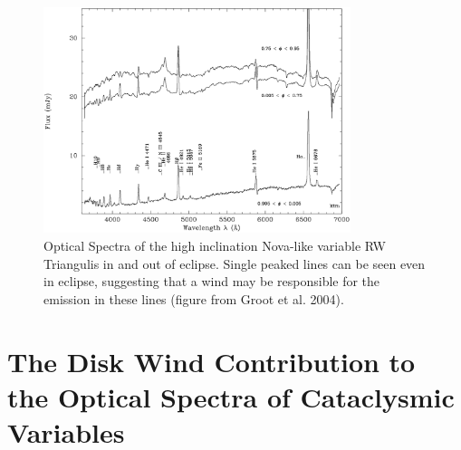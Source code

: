 \documentclass[useAMS,usenatbib,onecolumn]{mn2e2}
\begin{document}





%
%


\begin{figure}
\centering
\includegraphics[width=0.8\textwidth]{figures/groot11.eps}
\caption{Optical Spectra of the high inclination Nova-like variable RW Triangulis in and out of eclipse.
Single peaked lines can be seen even in eclipse, suggesting that a wind may be responsible for 
the emission in these lines (figure from Groot et al. 2004).}
\label{spec}
\end{figure}

\section{The Disk Wind Contribution to the Optical Spectra of Cataclysmic Variables}
\end{document}
